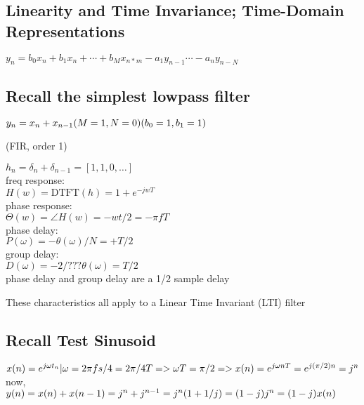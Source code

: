 
\subsection*{Linearity and Time Invariance; Time-Domain Representations}

$ y_n = b_0 x_n + b_1 x_n +  \cdots + b_Mx_{n*m}
    - a_1 y_{n-1} \cdots -a_n y_{n-N}$

\subsection*{Recall the simplest lowpass filter}
$ y_n = x_n + x_{n - 1} 
\\
            (M=1, N =0) \\
            (b_0 = 1, b_1 = 1)$

(FIR, order 1) 

$h_n = \delta_n + \delta_{n - 1} = [1, 1, 0, \dots]$\\

freq response:\\
$H(w) = \mbox{DTFT}(h) = 1 + e^{-jwT}$\\
phase response:\\
$\Theta(w) = \angle H(w) = -wt/2  = -\pi f T$ \\
phase delay: \\
$P(\omega) = -\theta(\omega)/N = + T / 2$ \\
group delay: \\
    $D(\omega) = -2 / ??? \theta(\omega) = T / 2$ \\

phase delay and group delay are a 1/2 sample delay 

These characteristics all apply to a Linear Time Invariant (LTI) filter

\subsection*{Recall Test Sinusoid}

$x(n) = e^{j\omega t_n} | \omega = 2 \pi fs / 4 = 2 \pi / 4T \\
                        => \omega T = \pi/2 \\
                        => x(n) = e^{j\omega n T} = e^{j (\pi/2) n} = j^n$\\

now, \\
$y(n) = x(n) + x(n -1)\\
          = j^n + j^{n - 1} = j^n(1 + 1/j)\\
          = (1 - j)j^n = (1 - j)x(n)$


